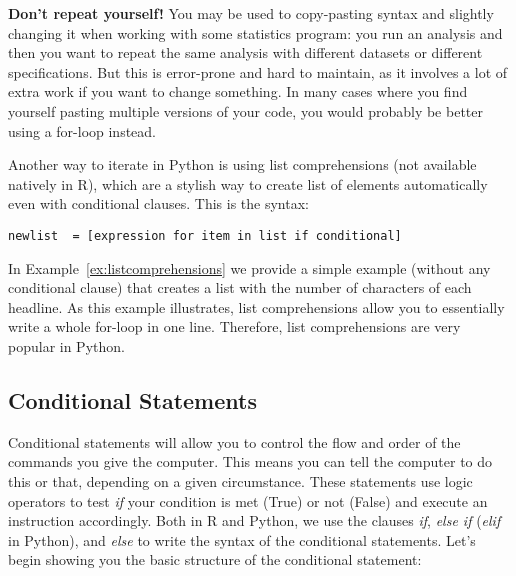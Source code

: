 
\begin{feature}
  \textbf{Don't repeat yourself!}
  You may be used to copy-pasting
  syntax and slightly changing it when working with some statistics
  program: you run an analysis and then you want to repeat the same
  analysis with different datasets or different specifications. But
  this is error-prone and hard to maintain, as it involves a lot of
  extra work if you want to change something. In many cases where you
  find yourself pasting multiple versions of your code, you would
  probably be better using a for-loop instead.
  \end{feature}


Another way to iterate in Python is using list comprehensions  (not available natively in R), which are a stylish way to create list of elements automatically even with conditional clauses. This is the syntax:

\begin{verbatim}
newlist  = [expression for item in list if conditional]
\end{verbatim}

In Example~\ref{ex:listcomprehensions} we provide a simple example (without any
conditional clause) that creates a list with the number of characters
of each headline. As this example illustrates, list comprehensions
allow you to essentially write a whole for-loop in one
line. Therefore, list comprehensions are very popular in Python.




\subsection{Conditional Statements}\label{sec:ifelse}

Conditional statements will allow you to control the flow and order of
the commands you give the computer. This means you can tell the
computer to do this or that, depending on a given circumstance. These
statements use logic operators to test \emph{if} your condition is met
(True) or not (False) and execute an instruction accordingly. Both in
R and Python, we use the clauses \emph{if}, \emph{else if}
(\emph{elif} in Python), and \emph{else} to write the syntax of the
conditional statements. Let's begin showing you the basic structure of
the conditional statement:

